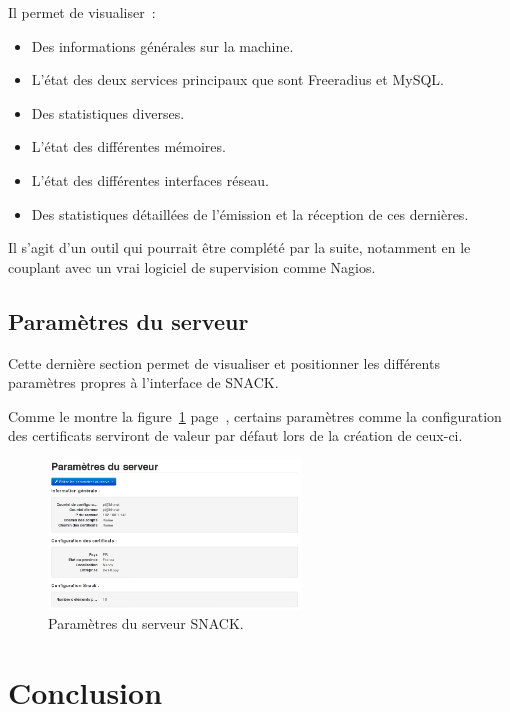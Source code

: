 Il permet de visualiser~:

\begin{itemize}
\item Des informations générales sur la machine.
\item L'état des deux services principaux que sont Freeradius et MySQL.
\item Des statistiques diverses.
\item L'état des différentes mémoires.
\item L'état des différentes interfaces réseau.
\item Des statistiques détaillées de l'émission et la réception de ces dernières.
\end{itemize}

Il s'agit d'un outil qui pourrait être complété par la suite, notamment en le couplant avec un vrai logiciel de supervision comme Nagios.

\subsection{Paramètres du serveur}

Cette dernière section permet de visualiser et positionner les différents paramètres propres à l'interface de SNACK.

Comme le montre la figure~\ref{parametres} page~\pageref{parametres}, certains paramètres comme la configuration des certificats serviront de valeur par défaut lors de la création de ceux-ci.

\begin{figure}[!h]
	\begin{center}
	    \includegraphics[width=0.6\textwidth]{img/parametres.png}
	\end{center}
	\caption{Paramètres du serveur SNACK.}
	\label{parametres}
\end{figure}

\section{Conclusion}

